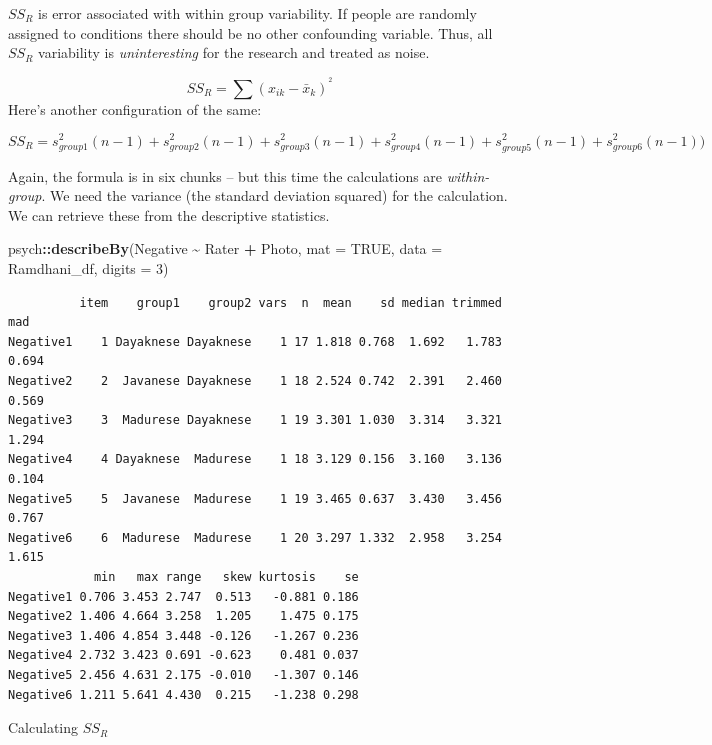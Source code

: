 \documentclass[
  11pt,
]{book}
\newenvironment{Shaded}{\begin{snugshade}}{\end{snugshade}}
\newcommand{\AttributeTok}[1]{\textcolor[rgb]{0.27,0.27,0.27}{#1}}
\newcommand{\ConstantTok}[1]{\textcolor[rgb]{0.37,0.37,0.37}{#1}}
\newcommand{\DecValTok}[1]{\textcolor[rgb]{0.06,0.06,0.06}{#1}}
\newcommand{\FunctionTok}[1]{\textcolor[rgb]{0.27,0.27,0.27}{\textbf{#1}}}
\newcommand{\NormalTok}[1]{#1}
\newcommand{\SpecialCharTok}[1]{\textcolor[rgb]{0.43,0.43,0.43}{\textbf{#1}}}
\begin{document}
\(SS_R\) is error associated with within group variability. If people are randomly assigned to conditions there should be no other confounding variable. Thus, all \(SS_R\) variability is \emph{uninteresting} for the research and treated as noise.

\[SS_{R}= \sum(x_{ik}-\bar{x}_{k})^{^{2}}\] Here's another configuration of the same:

\[SS_{R}= s_{group1}^{2}(n-1) + s_{group2}^{2}(n-1) + s_{group3}^{2}(n-1) + s_{group4}^{2}(n-1) + s_{group5}^{2}(n-1) + s_{group6}^{2}(n-1))\]

Again, the formula is in six chunks -- but this time the calculations are \emph{within-group}. We need the variance (the standard deviation squared) for the calculation. We can retrieve these from the descriptive statistics.

\begin{Shaded}
\begin{Highlighting}[]
\NormalTok{psych}\SpecialCharTok{::}\FunctionTok{describeBy}\NormalTok{(Negative }\SpecialCharTok{\textasciitilde{}}\NormalTok{ Rater }\SpecialCharTok{+}\NormalTok{ Photo, }\AttributeTok{mat =} \ConstantTok{TRUE}\NormalTok{, }\AttributeTok{data =}\NormalTok{ Ramdhani\_df,}
    \AttributeTok{digits =} \DecValTok{3}\NormalTok{)}
\end{Highlighting}
\end{Shaded}

\begin{verbatim}
          item    group1    group2 vars  n  mean    sd median trimmed   mad
Negative1    1 Dayaknese Dayaknese    1 17 1.818 0.768  1.692   1.783 0.694
Negative2    2  Javanese Dayaknese    1 18 2.524 0.742  2.391   2.460 0.569
Negative3    3  Madurese Dayaknese    1 19 3.301 1.030  3.314   3.321 1.294
Negative4    4 Dayaknese  Madurese    1 18 3.129 0.156  3.160   3.136 0.104
Negative5    5  Javanese  Madurese    1 19 3.465 0.637  3.430   3.456 0.767
Negative6    6  Madurese  Madurese    1 20 3.297 1.332  2.958   3.254 1.615
            min   max range   skew kurtosis    se
Negative1 0.706 3.453 2.747  0.513   -0.881 0.186
Negative2 1.406 4.664 3.258  1.205    1.475 0.175
Negative3 1.406 4.854 3.448 -0.126   -1.267 0.236
Negative4 2.732 3.423 0.691 -0.623    0.481 0.037
Negative5 2.456 4.631 2.175 -0.010   -1.307 0.146
Negative6 1.211 5.641 4.430  0.215   -1.238 0.298
\end{verbatim}

Calculating \(SS_R\)
\end{document}
